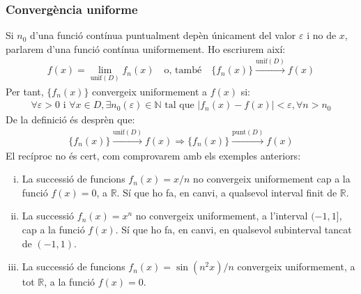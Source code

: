 \subsubsection*{Convergència uniforme}
Si $n_{0}$ d'una funció contínua puntualment depèn únicament del valor $\varepsilon$ i no de $x$, parlarem d'una funció contínua uniformement. Ho escriurem així:
\begin{align}
    f(x) = \lim_{\text{unif}(D)} f_{n}(x) \quad \text{o, també} \quad \{ f_{n} (x)\} \overset{\text{unif}(D)}{\longrightarrow} f(x)
\end{align}
Per tant, $\{f_{n}(x)\}$ convergeix uniformement a $f(x)$ si:
\begin{align}
    \forall \varepsilon > 0 \text{ i } \forall x \in D, \exists n_{0}(\varepsilon) \in \mathbb{N} \text{ tal que } |f_{n} (x) - f(x) | < \varepsilon, \forall n > n_{0}
\end{align}
De la definició és desprèn que:
\begin{align}
    \{ f_{n} (x)\} \overset{\text{unif}(D)}{\longrightarrow} f(x) \Rightarrow \{ f_{n} (x)\} \overset{\text{punt}(D)}{\longrightarrow} f(x)
\end{align}
El recíproc no és cert, com comprovarem amb els exemples anteriors:
\begin{enumerate}[i)]
    \item La successió de funcions $f_{n}(x) = x/n$ no convergeix uniformement cap a la funció $f(x) = 0$, a $\mathbb{R}$. Sí que ho fa, en canvi, a qualsevol interval finit de $\mathbb{R}$.
    \item La successió $f_{n}(x) = x^{n}$ no convergeix uniformement, a l'interval $(-1, 1]$, cap a la funció $f(x)$. Sí que ho fa, en canvi, en qualsevol subinterval tancat de $(-1,1)$.
    \item La successió de funcions $f_{n} (x) = \sin (n^{2}x)/n$ convergeix uniformement, a tot $\mathbb{R}$, a la funció $f(x) = 0$. 
\end{enumerate}


